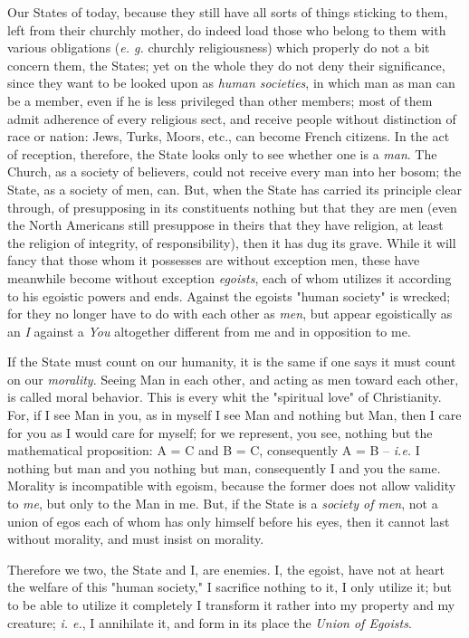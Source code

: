 \documentclass[a4paper]{book}
\begin{document}
Our States of today, because they still have all sorts of things sticking to 
them, left from their churchly mother, do indeed load those who belong to them 
with various obligations (\textit{e. g.} churchly religiousness) which 
properly do not a bit concern them, the States; yet on the whole they do not 
deny their significance, since they want to be looked upon as \textit{human 
societies}, in which man as man can be a member, even if he is less privileged 
than other members; most of them admit adherence of every religious sect, and 
receive people without distinction of race or nation: Jews, Turks, Moors, 
etc., can become French citizens. In the act of reception, therefore, the 
State looks only to see whether one is a \textit{man}. The Church, as a 
society of believers, could not receive every man into her bosom; the State, 
as a society of men, can. But, when the State has carried its principle clear 
through, of presupposing in its constituents nothing but that they are men 
(even the North Americans still presuppose in theirs that they have religion, 
at least the religion of integrity, of responsibility), then it has dug its 
grave. While it will fancy that those whom it possesses are without exception 
men, these have meanwhile become without exception \textit{egoists}, each of 
whom utilizes it according to his egoistic powers and ends. Against the 
egoists "{}human society"{} is wrecked; for they no longer have to do with 
each other as \textit{men}, but appear egoistically as an \textit{I} against a 
\textit{You} altogether different from me and in opposition to me.

If the State must count on our humanity, it is the same if one says it must 
count on our \textit{morality}. Seeing Man in each other, and acting as men 
toward each other, is called moral behavior. This is every whit the 
"{}spiritual love"{} of Christianity. For, if I see Man in you, as in myself I 
see Man and nothing but Man, then I care for you as I would care for myself; 
for we represent, you see, nothing but the mathematical proposition: A = C and 
B = C, consequently A = B -- \textit{i.e.} I nothing but man and you nothing 
but man, consequently I and you the same. Morality is incompatible with 
egoism, because the former does not allow validity to \textit{me}, but only to 
the Man in me. But, if the State is a \textit{society of men}, not a union of 
egos each of whom has only himself before his eyes, then it cannot last 
without morality, and must insist on morality.

Therefore we two, the State and I, are enemies. I, the egoist, have not at 
heart the welfare of this "{}human society,"{} I sacrifice nothing to it, I 
only utilize it; but to be able to utilize it completely I transform it rather 
into my property and my creature; \textit{i. e.}, I annihilate it, and form in 
its place the \textit{Union of Egoists}.
\end{document}
